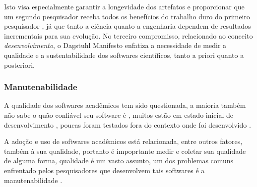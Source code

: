 
Isto visa especialmente garantir a longevidade dos artefatos e proporcionar que
um segundo pesquisador receba todos os benefícios do trabalho duro do primeiro
pesquisador , já que tanto a ciência quanto a
engenharia dependem de resultados incrementais para sua evolução. No terceiro
compromisso, relacionado ao conceito {\it desenvolvimento}, o Dagstuhl
Manifesto enfatiza a necessidade de medir a qualidade e a sustentabilidade dos
softwares científicos, tanto a priori quanto a posteriori.

\subsubsection{Manutenabilidade}


A qualidade dos softwares acadêmicos tem sido questionada,
a maioria também não sabe o quão confiável seu software é \cite{Merali2010Computational},
muitos estão em estado inicial de desenvolvimento \cite{marshall2013tools},
poucas foram testados fora do contexto onde foi desenvolvido \cite{Portillo12}.

%

A adoção e uso de softwares acadêmicos está relacionada, entre outros fatores,
também à sua qualidade, portanto é impoprtante medir e coletar sua qualidade de
alguma forma, qualidade é um vasto assunto, um dos problemas comuns enfrentado
pelos pesquisadores que desenvolvem tais softwares é a manutenabilidade
\cite{Prlic2012}.

